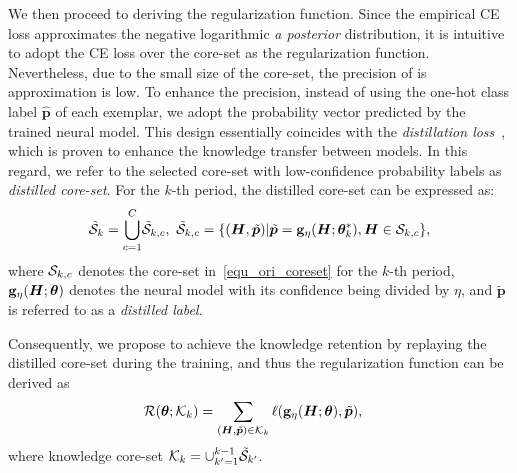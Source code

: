 We then proceed to deriving the regularization function.
Since the empirical CE loss approximates the negative logarithmic \emph{a posterior} distribution, it is intuitive to adopt the CE loss over the core-set as the regularization function.
Nevertheless, due to the small size of the core-set, the precision of is approximation is low.
To enhance the precision, instead of using the one-hot class label $\hat{\bm p}$ of each exemplar, we adopt the probability vector predicted by the trained neural model. 
This design essentially coincides with the \emph{distillation loss}~\cite{Gou21IJCV_Knowledge}, which is proven to enhance the knowledge transfer between models.
In this regard, we refer to the selected core-set with low-confidence probability labels as \emph{distilled core-set}.
For the $k$-th period, the distilled core-set can be expressed as:
\begin{align}
 \tilde{\mathcal{S}}_{k} =  \bigcup_{c=1}^{C} \!\tilde{\mathcal{S}}_{k,c}, ~
 \tilde{\mathcal{S}}_{k,c} = \{ (\bm H, \tilde{\bm p}) | \tilde{\bm p} = \mathbf{g}_{\eta}(\bm H; \bm\theta_{k}^*), \bm H \in \mathcal{S}_{k,c}\},  \nonumber
\end{align}
where $\mathcal{S}_{k,c}$ denotes the core-set in~\eqref{equ_ori_coreset} for the $k$-th period,
${\mathbf{g}}_{\eta}(\bm H; \bm\theta)$ denotes the neural model with its confidence being divided by $\eta$,
and $\tilde{\bm p}$ is referred to as a \emph{distilled label}.

Consequently, we propose to achieve the knowledge retention by replaying the distilled core-set during the training, and thus the regularization function can be derived as
\begin{align}
\label{equ_regu_func}
\mathcal{R}(\bm\theta; \mathcal{K}_{k}) &= \sum_{(\bm H, \tilde{\bm p})\in \mathcal{K}_k} {\ell({\mathbf{g}}_{\eta}(\bm H; \bm\theta), \tilde{\bm p})},
\end{align}
where knowledge core-set $\mathcal{K}_{k} = \cup_{k'=1}^{k-1}\tilde{\mathcal{S}}_{k'}$.

